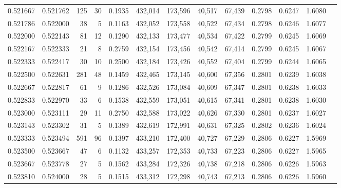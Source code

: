 \begin{tabular}{rrrrrrrrrrrrr}
0.521667 & 0.521762 &   125 &  30 &                                     0.1935 & 432,014 & 173,596 &  40,517 &  67,439 & 0.2798 & 0.6247 & 1.6080 \\
0.521786 & 0.522000 &    38 &   5 &                                     0.1163 & 432,052 & 173,558 &  40,522 &  67,434 & 0.2798 & 0.6246 & 1.6077 \\
0.522000 & 0.522143 &    81 &  12 &                                     0.1290 & 432,133 & 173,477 &  40,534 &  67,422 & 0.2799 & 0.6245 & 1.6069 \\
0.522167 & 0.522333 &    21 &   8 &                                     0.2759 & 432,154 & 173,456 &  40,542 &  67,414 & 0.2799 & 0.6245 & 1.6067 \\
0.522333 & 0.522417 &    30 &  10 &                                     0.2500 & 432,184 & 173,426 &  40,552 &  67,404 & 0.2799 & 0.6244 & 1.6065 \\
0.522500 & 0.522631 &   281 &  48 &                                     0.1459 & 432,465 & 173,145 &  40,600 &  67,356 & 0.2801 & 0.6239 & 1.6038 \\
0.522667 & 0.522817 &    61 &   9 &                                     0.1286 & 432,526 & 173,084 &  40,609 &  67,347 & 0.2801 & 0.6238 & 1.6033 \\
0.522833 & 0.522970 &    33 &   6 &                                     0.1538 & 432,559 & 173,051 &  40,615 &  67,341 & 0.2801 & 0.6238 & 1.6030 \\
0.523000 & 0.523111 &    29 &  11 &                                     0.2750 & 432,588 & 173,022 &  40,626 &  67,330 & 0.2801 & 0.6237 & 1.6027 \\
0.523143 & 0.523302 &    31 &   5 &                                     0.1389 & 432,619 & 172,991 &  40,631 &  67,325 & 0.2802 & 0.6236 & 1.6024 \\
0.523333 & 0.523494 &   591 &  96 &                                     0.1397 & 433,210 & 172,400 &  40,727 &  67,229 & 0.2806 & 0.6227 & 1.5969 \\
0.523500 & 0.523667 &    47 &   6 &                                     0.1132 & 433,257 & 172,353 &  40,733 &  67,223 & 0.2806 & 0.6227 & 1.5965 \\
0.523667 & 0.523778 &    27 &   5 &                                     0.1562 & 433,284 & 172,326 &  40,738 &  67,218 & 0.2806 & 0.6226 & 1.5963 \\
0.523810 & 0.524000 &    28 &   5 &                                     0.1515 & 433,312 & 172,298 &  40,743 &  67,213 & 0.2806 & 0.6226 & 1.5960 \\

\end{tabular}
